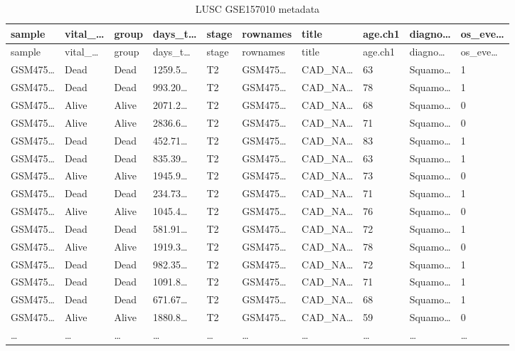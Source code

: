 \documentclass[
]{article}
\begin{document}
\begin{longtable}[]{@{}llllllllll@{}}
\caption{\label{tab:LUSC-GSE157010-metadata}LUSC GSE157010 metadata}\tabularnewline
\toprule
sample & vital\_\ldots{} & group & days\_t\ldots{} & stage & rownames & title & age.ch1 & diagno\ldots{} & os\_eve\ldots{}\tabularnewline
\midrule
\endfirsthead
\toprule
sample & vital\_\ldots{} & group & days\_t\ldots{} & stage & rownames & title & age.ch1 & diagno\ldots{} & os\_eve\ldots{}\tabularnewline
\midrule
\endhead
GSM475\ldots{} & Dead & Dead & 1259.5\ldots{} & T2 & GSM475\ldots{} & CAD\_NA\ldots{} & 63 & Squamo\ldots{} & 1\tabularnewline
GSM475\ldots{} & Dead & Dead & 993.20\ldots{} & T2 & GSM475\ldots{} & CAD\_NA\ldots{} & 78 & Squamo\ldots{} & 1\tabularnewline
GSM475\ldots{} & Alive & Alive & 2071.2\ldots{} & T2 & GSM475\ldots{} & CAD\_NA\ldots{} & 68 & Squamo\ldots{} & 0\tabularnewline
GSM475\ldots{} & Alive & Alive & 2836.6\ldots{} & T2 & GSM475\ldots{} & CAD\_NA\ldots{} & 71 & Squamo\ldots{} & 0\tabularnewline
GSM475\ldots{} & Dead & Dead & 452.71\ldots{} & T2 & GSM475\ldots{} & CAD\_NA\ldots{} & 83 & Squamo\ldots{} & 1\tabularnewline
GSM475\ldots{} & Dead & Dead & 835.39\ldots{} & T2 & GSM475\ldots{} & CAD\_NA\ldots{} & 63 & Squamo\ldots{} & 1\tabularnewline
GSM475\ldots{} & Alive & Alive & 1945.9\ldots{} & T2 & GSM475\ldots{} & CAD\_NA\ldots{} & 73 & Squamo\ldots{} & 0\tabularnewline
GSM475\ldots{} & Dead & Dead & 234.73\ldots{} & T2 & GSM475\ldots{} & CAD\_NA\ldots{} & 71 & Squamo\ldots{} & 1\tabularnewline
GSM475\ldots{} & Alive & Alive & 1045.4\ldots{} & T2 & GSM475\ldots{} & CAD\_NA\ldots{} & 76 & Squamo\ldots{} & 0\tabularnewline
GSM475\ldots{} & Dead & Dead & 581.91\ldots{} & T2 & GSM475\ldots{} & CAD\_NA\ldots{} & 72 & Squamo\ldots{} & 1\tabularnewline
GSM475\ldots{} & Alive & Alive & 1919.3\ldots{} & T2 & GSM475\ldots{} & CAD\_NA\ldots{} & 78 & Squamo\ldots{} & 0\tabularnewline
GSM475\ldots{} & Dead & Dead & 982.35\ldots{} & T2 & GSM475\ldots{} & CAD\_NA\ldots{} & 72 & Squamo\ldots{} & 1\tabularnewline
GSM475\ldots{} & Dead & Dead & 1091.8\ldots{} & T2 & GSM475\ldots{} & CAD\_NA\ldots{} & 71 & Squamo\ldots{} & 1\tabularnewline
GSM475\ldots{} & Dead & Dead & 671.67\ldots{} & T2 & GSM475\ldots{} & CAD\_NA\ldots{} & 68 & Squamo\ldots{} & 1\tabularnewline
GSM475\ldots{} & Alive & Alive & 1880.8\ldots{} & T2 & GSM475\ldots{} & CAD\_NA\ldots{} & 59 & Squamo\ldots{} & 0\tabularnewline
\ldots{} & \ldots{} & \ldots{} & \ldots{} & \ldots{} & \ldots{} & \ldots{} & \ldots{} & \ldots{} & \ldots{}\tabularnewline
\bottomrule
\end{longtable}
\end{document}
